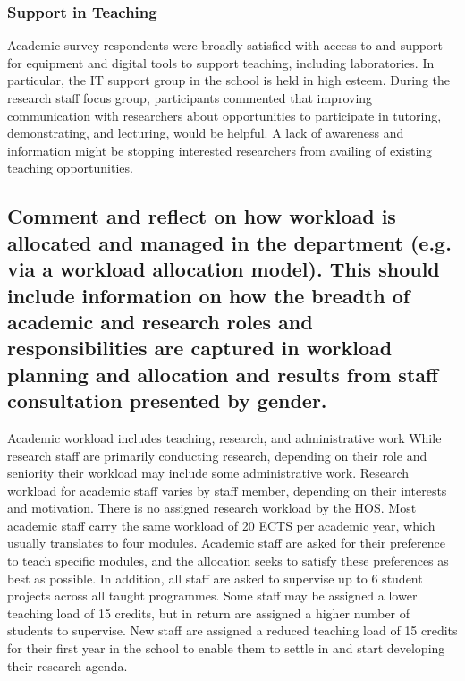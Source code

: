 \subsubsection{Support in Teaching}
Academic survey respondents  were broadly satisfied with access to and support for equipment and digital tools to support teaching, including laboratories. In particular, the IT support group in the school is held in high esteem. %
During the research staff focus group, participants commented that improving communication with researchers about opportunities to participate in tutoring, demonstrating, and lecturing, would be helpful. 
A lack of awareness and information might be stopping interested researchers from availing of existing teaching opportunities.






\subsection{Comment and reflect on how workload is allocated and managed in the department (e.g. via a workload allocation model). This should include information on how the breadth of academic and research roles and responsibilities are captured in workload planning and allocation and results from staff consultation presented by gender.}\label{sub:workload}

Academic workload includes teaching, research, and administrative work 
While research staff are primarily conducting research, depending on their role and seniority their workload may include some administrative work.
Research workload for academic staff varies by staff member, depending on their interests and motivation. There is no assigned research workload by the \ac{HOS}. 
Most academic staff carry the same workload of 20 ECTS per academic year, which usually translates to four modules. 
Academic staff are asked for their preference to teach specific modules, and the allocation seeks to satisfy these preferences as best as possible. In addition, all staff are asked to supervise up to 6 student projects across all taught programmes. Some staff may be assigned a lower teaching load of 15 credits, but in return are assigned  a higher number of students to supervise. 
New staff are assigned a reduced teaching load of 15 credits for their first year in the school to enable them to settle in and start developing their research agenda.

